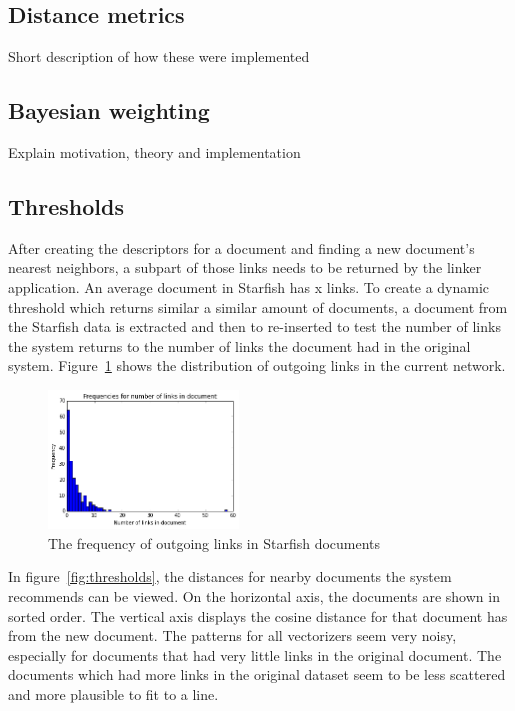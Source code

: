 \subsection{Distance metrics}
Short description of how these were implemented

\subsection{Bayesian weighting}
Explain motivation, theory and implementation 

\subsection{Thresholds}
After creating the descriptors for a document and finding a new document's nearest neighbors, a subpart of those links needs to be returned by the linker application. An average document in Starfish has x links. To create a dynamic threshold which returns similar a similar amount of documents, a document from the Starfish data is extracted and then to re-inserted to test the number of links the system returns to the number of links the document had in the original system. Figure~\ref{fig:link_histogram} shows the distribution of outgoing links in the current network.

\begin{figure}[h]
\centering
\includegraphics[width =0.45\textwidth]{images/link_histogram}
\caption{The frequency of outgoing links in Starfish documents}
\label{fig:link_histogram}
\end{figure}

In figure~\ref{fig:thresholds}, the distances for nearby documents the system recommends can be viewed. On the horizontal axis, the documents are shown in sorted order. The vertical axis displays the cosine distance for that document has from the new document. The patterns for all vectorizers seem very noisy, especially for documents that had very little links in the original document. The documents which had more links in the original dataset seem to be less scattered and more plausible to fit to a line.

